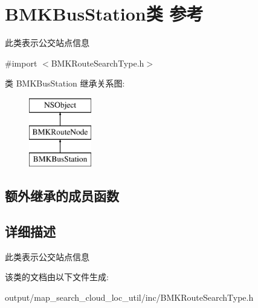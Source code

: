 \hypertarget{interface_b_m_k_bus_station}{\section{B\+M\+K\+Bus\+Station类 参考}
\label{interface_b_m_k_bus_station}
}


此类表示公交站点信息  




{\ttfamily \#import $<$B\+M\+K\+Route\+Search\+Type.\+h$>$}

类 B\+M\+K\+Bus\+Station 继承关系图\+:\begin{figure}[H]
\begin{center}
\leavevmode
\includegraphics[height=3.000000cm]{interface_b_m_k_bus_station}
\end{center}
\end{figure}
\subsection*{额外继承的成员函数}


\subsection{详细描述}
此类表示公交站点信息 

该类的文档由以下文件生成\+:\begin{DoxyCompactItemize}
\item 
output/map\+\_\+search\+\_\+cloud\+\_\+loc\+\_\+util/inc/B\+M\+K\+Route\+Search\+Type.\+h\end{DoxyCompactItemize}
